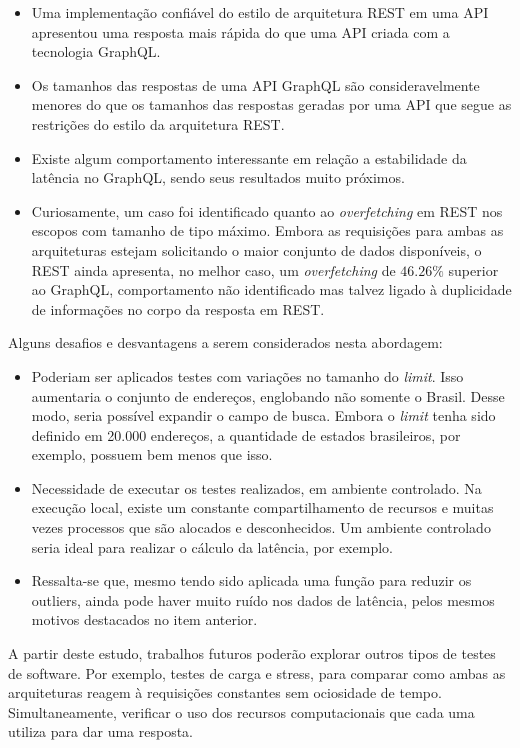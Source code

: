 \documentclass[conference]{IEEEtran}
\begin{document}
\begin{itemize}
    \item Uma implementação confiável do estilo de arquitetura REST em uma API apresentou uma resposta mais rápida do que uma API criada com a tecnologia GraphQL.
    \item Os tamanhos das respostas de uma API GraphQL são consideravelmente menores do que os tamanhos das respostas geradas por uma API que segue as restrições do estilo da arquitetura REST.
    \item Existe algum comportamento interessante em relação a estabilidade da latência no GraphQL, sendo seus resultados muito próximos.
    \item Curiosamente, um caso foi identificado quanto ao \textit{overfetching} em REST nos escopos com tamanho de tipo máximo. Embora as requisições para ambas as arquiteturas estejam solicitando o maior conjunto de dados disponíveis, o REST ainda apresenta, no melhor caso, um \textit{overfetching} de $46.26\%$ superior ao GraphQL, comportamento não identificado mas talvez ligado à duplicidade de informações no corpo da resposta em REST.
\end{itemize}

Alguns desafios e desvantagens a serem considerados nesta abordagem:

\begin{itemize}
    \item Poderiam ser aplicados testes com variações no tamanho do \textit{limit}. Isso aumentaria o conjunto de endereços, englobando não somente o Brasil. Desse modo, seria possível expandir o campo de busca. Embora o \textit{limit} tenha sido definido em 20.000 endereços, a quantidade de estados brasileiros, por exemplo, possuem bem menos que isso.
    \item Necessidade de executar os testes realizados, em ambiente controlado. Na execução local, existe um constante compartilhamento de recursos e muitas vezes processos que são alocados e desconhecidos. Um ambiente controlado seria ideal para realizar o cálculo da latência, por exemplo.
    \item Ressalta-se que, mesmo tendo sido aplicada uma função para reduzir os outliers, ainda pode haver muito ruído nos dados de latência, pelos mesmos motivos destacados no item anterior.
\end{itemize}

A partir deste estudo, trabalhos futuros poderão explorar outros tipos de testes de software. Por exemplo, testes de carga e stress, para comparar como ambas as arquiteturas reagem à requisições constantes sem ociosidade de tempo. Simultaneamente, verificar o uso dos recursos computacionais que cada uma utiliza para dar uma resposta.



\end{document}

